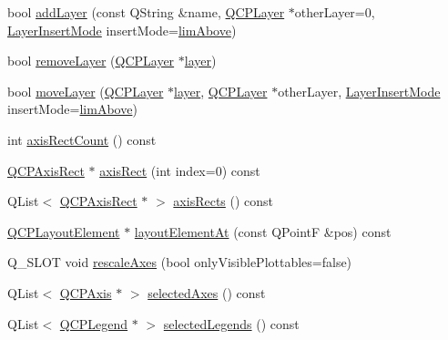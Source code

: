 \begin{DoxyCompactItemize}
\item 
bool \hyperlink{class_q_custom_plot_ad5255393df078448bb6ac83fa5db5f52}{add\+Layer} (const Q\+String \&name, \hyperlink{class_q_c_p_layer}{Q\+C\+P\+Layer} $\ast$other\+Layer=0, \hyperlink{class_q_custom_plot_a75a8afbe6ef333b1f3d47abb25b9add7}{Layer\+Insert\+Mode} insert\+Mode=\hyperlink{class_q_custom_plot_a75a8afbe6ef333b1f3d47abb25b9add7a062b0b7825650b432a713c0df6742d41}{lim\+Above})
\item 
bool \hyperlink{class_q_custom_plot_a40f75e342c5eaab6a86066a42a0e2a94}{remove\+Layer} (\hyperlink{class_q_c_p_layer}{Q\+C\+P\+Layer} $\ast$\hyperlink{class_q_custom_plot_aac492da01782820454e9136a8db28182}{layer})
\item 
bool \hyperlink{class_q_custom_plot_ae896140beff19424e9e9e02d6e331104}{move\+Layer} (\hyperlink{class_q_c_p_layer}{Q\+C\+P\+Layer} $\ast$\hyperlink{class_q_custom_plot_aac492da01782820454e9136a8db28182}{layer}, \hyperlink{class_q_c_p_layer}{Q\+C\+P\+Layer} $\ast$other\+Layer, \hyperlink{class_q_custom_plot_a75a8afbe6ef333b1f3d47abb25b9add7}{Layer\+Insert\+Mode} insert\+Mode=\hyperlink{class_q_custom_plot_a75a8afbe6ef333b1f3d47abb25b9add7a062b0b7825650b432a713c0df6742d41}{lim\+Above})
\item 
int \hyperlink{class_q_custom_plot_a340fa24b1607e445cedda9685670ead3}{axis\+Rect\+Count} () const 
\item 
\hyperlink{class_q_c_p_axis_rect}{Q\+C\+P\+Axis\+Rect} $\ast$ \hyperlink{class_q_custom_plot_a4a37a1add5fe63060ac518cf0a4c4050}{axis\+Rect} (int index=0) const 
\item 
Q\+List$<$ \hyperlink{class_q_c_p_axis_rect}{Q\+C\+P\+Axis\+Rect} $\ast$ $>$ \hyperlink{class_q_custom_plot_afd67094aaeccbc5719761348b2d8c891}{axis\+Rects} () const 
\item 
\hyperlink{class_q_c_p_layout_element}{Q\+C\+P\+Layout\+Element} $\ast$ \hyperlink{class_q_custom_plot_a840458186d4483c8a42d6a399448d38f}{layout\+Element\+At} (const Q\+PointF \&pos) const 
\item 
Q\+\_\+\+S\+L\+OT void \hyperlink{class_q_custom_plot_ad86528f2cee6c7e446dea4a6e8839935}{rescale\+Axes} (bool only\+Visible\+Plottables=false)
\item 
Q\+List$<$ \hyperlink{class_q_c_p_axis}{Q\+C\+P\+Axis} $\ast$ $>$ \hyperlink{class_q_custom_plot_aa6baf867e8beb96ed5bd471f83ece903}{selected\+Axes} () const 
\item 
Q\+List$<$ \hyperlink{class_q_c_p_legend}{Q\+C\+P\+Legend} $\ast$ $>$ \hyperlink{class_q_custom_plot_a1ea6297300c3e2770e65f95836411755}{selected\+Legends} () const 

\end{DoxyCompactItemize}
